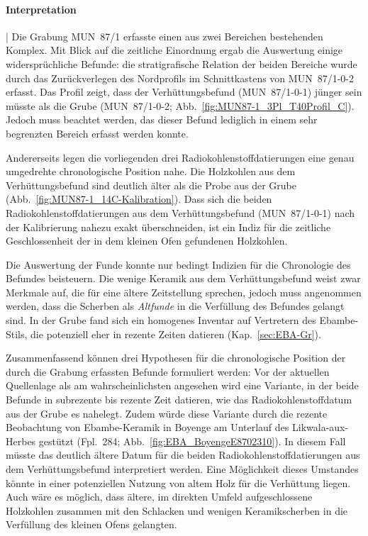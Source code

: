 \paragraph{Interpretation}\hspace{-.5em}|\hspace{.5em}%
Die Grabung MUN~87/1 erfasste einen aus zwei Bereichen bestehenden Komplex. Mit Blick auf die zeitliche Einordnung ergab die Auswertung einige widersprüchliche Befunde: die stratigrafische Relation der beiden Bereiche wurde durch das Zurückverlegen des Nordprofils im Schnittkastens von MUN~87/1-0-2 erfasst. Das Profil zeigt, dass der Verhüttungsbefund (MUN~87/1-0-1) jünger sein müsste als die Grube (MUN~87/1-0-2; Abb.~\ref{fig:MUN87-1_3Pl_T40Profil_C}). Jedoch muss beachtet werden, das dieser Befund lediglich in einem sehr begrenzten Bereich erfasst werden konnte.

Andererseits legen die vorliegenden drei Radiokohlenstoffdatierungen eine genau umgedrehte chronologische Position nahe. Die Holzkohlen aus dem Verhüttungsbefund sind deutlich älter als die Probe aus der Grube (Abb.~\ref{fig:MUN87-1_14C-Kalibration}). Dass sich die beiden Radiokohlenstoffdatierungen aus dem Verhüttungsbefund (MUN~87/1-0-1) nach der Kalibrierung nahezu exakt überschneiden, ist ein Indiz für die zeitliche Geschlossenheit der in dem kleinen Ofen gefundenen Holzkohlen.

Die Auswertung der Funde konnte nur bedingt Indizien für die Chronologie des Befundes beisteuern. Die wenige Keramik aus dem Verhüttungsbefund weist zwar Merkmale auf, die für eine ältere Zeitstellung sprechen, jedoch muss angenommen werden, dass die Scherben als \textit{Altfunde} in die Verfüllung des Befundes gelangt sind. In der Grube fand sich ein homogenes Inventar auf Vertretern des Ebambe-Stils, die potenziell eher in rezente Zeiten datieren (Kap.~\ref{sec:EBA-Gr}).

Zusammenfassend können drei Hypothesen für die chronologische Position der durch die Grabung erfassten Befunde formuliert werden: Vor der aktuellen Quellenlage als am wahrscheinlichsten angesehen wird eine Variante, in der beide Befunde in subrezente bis rezente Zeit datieren, wie das Radiokohlenstoffdatum aus der Grube es nahelegt. Zudem würde diese Variante durch die rezente Beobachtung von Ebambe-Keramik in Boyenge am Unterlauf des \mbox{Likwala}-\mbox{aux}-\mbox{Herbes} gestützt (Fpl.~284; Abb.~\ref{fig:EBA_BoyengeE8702310}). In diesem Fall müsste das deutlich ältere Datum für die beiden Radiokohlenstoffdatierungen aus dem Verhüttungsbefund interpretiert werden. Eine Möglichkeit dieses Umstandes könnte in einer potenziellen Nutzung von altem Holz für die Verhüttung liegen. Auch wäre es möglich, dass ältere, im direkten Umfeld aufgeschlossene Holzkohlen zusammen mit den Schlacken und wenigen Keramikscherben in die Verfüllung des kleinen Ofens gelangten.

